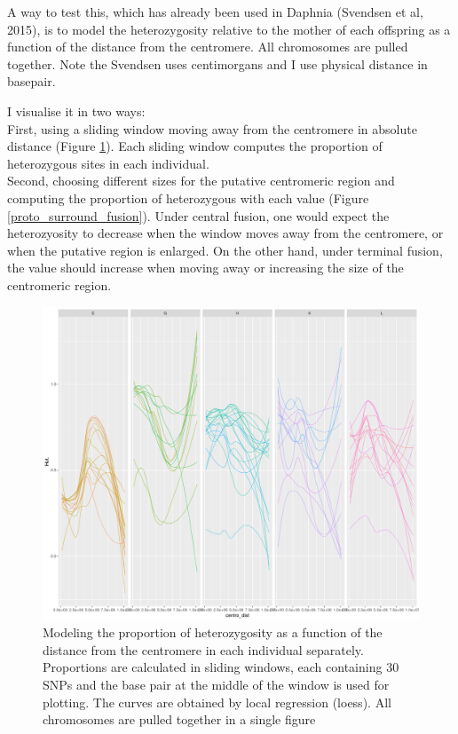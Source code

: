 \documentclass[10pt,a4paper]{report}
\begin{document}
A way to test this, which has already been used in Daphnia (Svendsen et al, 2015), is to model the heterozygosity relative to the mother of each offspring as a function of the distance from the centromere. All chromosomes are pulled together. Note the Svendsen uses centimorgans and I use physical distance in basepair.

I visualise it in two ways:\\
First, using a sliding window moving away from the centromere in absolute distance (Figure \ref{proto_slide_fusion}). Each sliding window computes the proportion of heterozygous sites in each individual. \\
Second, choosing different sizes for the putative centromeric region and computing the proportion of heterozygous with each value (Figure \ref{proto_surround_fusion}). Under central fusion, one would expect the heterozyosity to decrease when the window moves away from the centromere, or when the putative region is enlarged. On the other hand, under terminal fusion, the value should increase when moving away or increasing the size of the centromeric region.

\begin{figure}[h]
	\begin{center}
		\includegraphics[width=1.1\textwidth]{Num_CSD_loci/pooled_chr_centro_dist_win30.pdf}
		\caption{Modeling the proportion of heterozygosity as a function of the distance from the centromere in each individual separately. Proportions are calculated in sliding windows, each containing 30 SNPs and the base pair at the middle of the window is used for plotting. The curves are obtained by local regression (loess). All chromosomes are pulled together in a single figure}
		\label{proto_slide_fusion}
	\end{center}
\end{figure}
\end{document}

